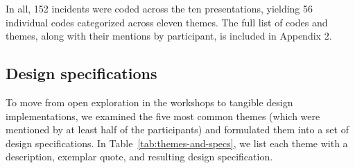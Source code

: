 \documentclass[letterpaper, 12pt]{article}
\begin{document}

In all, 152 incidents were coded across the ten presentations, yielding 56 individual codes categorized across eleven themes. The full list of codes and themes, along with their mentions by participant, is included in Appendix 2. 

\subsection{Design specifications}
\label{ch3-sec:design-specifications}

To move from open exploration in the workshops to tangible design implementations, we examined the five most common themes (which were mentioned by at least half of the participants) and formulated them into a set of design specifications. In Table~\ref{tab:themes-and-specs}, we list each theme with a description, exemplar quote, and resulting design specification. 
\end{document}
